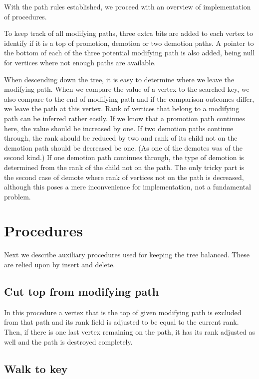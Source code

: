 With the path rules established, we proceed with an overview of implementation of procedures.

To keep track of all modifying paths, three extra bits are added to each vertex to identify if it is a top of promotion, demotion or two demotion paths. 
A pointer to the bottom of each of the three potential modifying path is also added, being null for vertices where not enough paths are available.

When descending down the tree, it is easy to determine where we leave the modifying path. 
When we compare the value of a vertex to the searched key, we also compare to the end of modifying path and if the comparison outcomes differ, we leave the path at this vertex. 
Rank of vertices that belong to a modifying path can be inferred rather easily. 
If we know that a promotion path continues here, the value should be increased by one. 
If two demotion paths continue through, the rank should be reduced by two and rank of its child not on the demotion path should be decreased be one. (As one of the demotes was of the second kind.)
If one demotion path continues through, the type of demotion is determined from the rank of the child not on the path. 
The only tricky part is the second case of demote where rank of vertices not on the path is decreased, although this poses a mere inconvenience for implementation, not a fundamental problem.

\section{Procedures}

Next we describe auxiliary procedures used for keeping the tree balanced. These are relied upon by insert and delete.

\subsection{Cut top from modifying path}

In this procedure a vertex that is the top of given modifying path is excluded from that path and its rank field is adjusted to be equal to the current rank. Then, if there is one last vertex remaining on the path, it has its rank adjusted as well and the path is destroyed completely.

\subsection{Walk to key}


